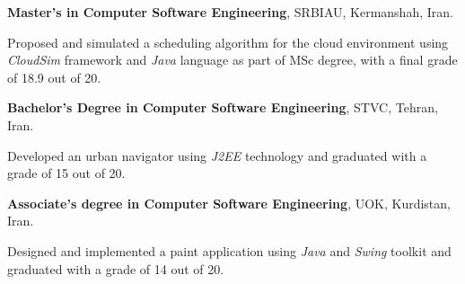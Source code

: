 
\begin{scholarship}
{\textbf{Master's in Computer Software Engineering}, SRBIAU, Kermanshah, Iran.

Proposed and simulated a scheduling algorithm for the cloud environment using \textit{CloudSim} framework and \textit{Java} language as part of MSc degree, with a final grade of 18.9 out of 20. \vspace{5 pt}
}
				{\textbf{Bachelor's Degree in Computer Software Engineering}, STVC, Tehran, Iran.
 
 Developed an urban navigator using \textit{J2EE} technology and graduated with a grade of 15 out of 20. \vspace{5 pt}	
 }		
				{\textbf{Associate's degree in Computer Software Engineering}, UOK, Kurdistan, Iran.
 
 Designed and implemented a paint application using \textit{Java} and \textit{Swing} toolkit and graduated with a grade of 14 out of 20.
 }
\end{scholarship}